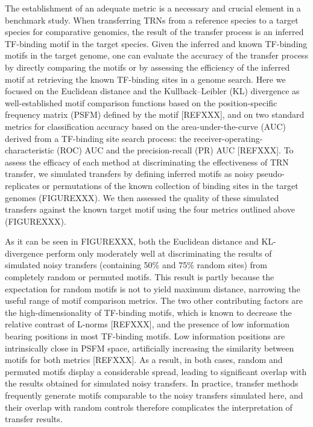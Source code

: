 The establishment of an adequate metric is a necessary and crucial element in a
benchmark study. When transferring TRNs from a reference species to a target
species for comparative genomics, the result of the transfer process is an
inferred TF-binding motif in the target species. Given the inferred and known
TF-binding motifs in the target genome, one can evaluate the accuracy of the
transfer process by directly comparing the motifs or by assessing the
efficiency of the inferred motif at retrieving the known TF-binding sites in a
genome search. Here we focused on the Euclidean distance and the
Kullback–Leibler (KL) divergence as well-established motif comparison functions
based on the position-specific frequency matrix (PSFM) defined by the motif
[REFXXX], and on two standard metrics for classification accuracy based on the
area-under-the-curve (AUC) derived from a TF-binding site search process: the
receiver-operating-characteristic (ROC) AUC and the precision-recall (PR) AUC
[REFXXX]. To assess the efficacy of each method at discriminating the
effectiveness of TRN transfer, we simulated transfers by defining inferred
motifs as noisy pseudo-replicates or permutations of the known collection of
binding sites in the target genomes (FIGUREXXX). We then assessed the quality
of these simulated transfers against the known target motif using the four
metrics outlined above (FIGUREXXX).

As it can be seen in FIGUREXXX, both the Euclidean distance and KL-divergence
perform only moderately well at discriminating the results of simulated noisy
transfers (containing 50\% and 75\% random sites) from completely random or
permuted motifs. This result is partly because the expectation for random
motifs is not to yield maximum distance, narrowing the useful range of motif
comparison metrics. The two other contributing factors are the
high-dimensionality of TF-binding motifs, which is known to decrease the
relative contrast of L-norms [REFXXX], and the presence of low information
bearing positions in most TF-binding motifs. Low information positions are
intrinsically close in PSFM space, artificially increasing the similarity
between motifs for both metrics [REFXXX]. As a result, in both cases, random
and permuted motifs display a considerable spread, leading to significant
overlap with the results obtained for simulated noisy transfers. In practice,
transfer methods frequently generate motifs comparable to the noisy transfers
simulated here, and their overlap with random controls therefore complicates
the interpretation of transfer results.

